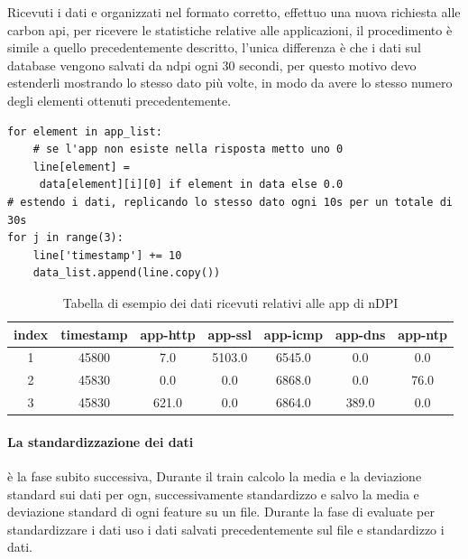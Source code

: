 Ricevuti i dati e organizzati nel formato corretto, effettuo una nuova richiesta alle carbon api, per ricevere le statistiche relative alle applicazioni, il procedimento è simile a quello precedentemente descritto, l'unica differenza è che i dati sul database vengono salvati da ndpi ogni 30 secondi, per questo motivo devo estenderli mostrando lo stesso dato più volte, in modo da avere lo stesso numero degli elementi ottenuti precedentemente.

\begin{lstlisting}[language=python3]
for element in app_list:
    # se l'app non esiste nella risposta metto uno 0
    line[element] =
     data[element][i][0] if element in data else 0.0
# estendo i dati, replicando lo stesso dato ogni 10s per un totale di 30s
for j in range(3):
    line['timestamp'] += 10
    data_list.append(line.copy())
\end{lstlisting}

\begin{table}[]

    \begin{tabular}{||c c c c c c c||} 
    \hline
    index & timestamp  & app-http & app-ssl & app-icmp & app-dns & app-ntp \\ [0.5ex] 
    \hline\hline
    1 & 45800 & 7.0 & 5103.0 & 6545.0 & 0.0 &  0.0\\ 
    \hline
    2 & 45830 & 0.0 & 0.0 & 6868.0& 0.0 &  76.0 \\
    \hline
    3 & 45830 & 621.0 & 0.0 & 6864.0 & 389.0  &  0.0 \\
    \hline
    \end{tabular}
    \caption{Tabella di esempio dei dati ricevuti relativi alle app di nDPI}
    \label{table:tabella_dati_2}
\end{table}


\paragraph{La standardizzazione dei dati} è la fase subito successiva, 
Durante il train calcolo la media e la deviazione standard sui dati per ogn, successivamente standardizzo e salvo la media e deviazione standard di ogni feature su un file.
Durante la fase di evaluate per standardizzare i dati uso i dati salvati precedentemente sul file e standardizzo i dati.

